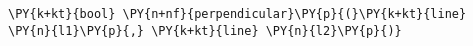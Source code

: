 \begin{Verbatim}[commandchars=\\\{\}]
    \PY{k+kt}{bool} \PY{n+nf}{perpendicular}\PY{p}{(}\PY{k+kt}{line} \PY{n}{l1}\PY{p}{,} \PY{k+kt}{line} \PY{n}{l2}\PY{p}{)}
\end{Verbatim}

